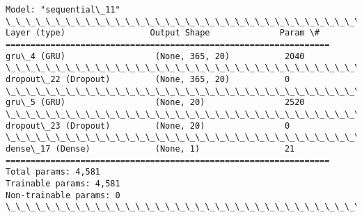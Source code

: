 \documentclass[11pt]{article}
\begin{document}
    \begin{Verbatim}[commandchars=\\\{\}]
Model: "sequential\_11"
\_\_\_\_\_\_\_\_\_\_\_\_\_\_\_\_\_\_\_\_\_\_\_\_\_\_\_\_\_\_\_\_\_\_\_\_\_\_\_\_\_\_\_\_\_\_\_\_\_\_\_\_\_\_\_\_\_\_\_\_\_\_\_\_\_
Layer (type)                 Output Shape              Param \#
=================================================================
gru\_4 (GRU)                  (None, 365, 20)           2040
\_\_\_\_\_\_\_\_\_\_\_\_\_\_\_\_\_\_\_\_\_\_\_\_\_\_\_\_\_\_\_\_\_\_\_\_\_\_\_\_\_\_\_\_\_\_\_\_\_\_\_\_\_\_\_\_\_\_\_\_\_\_\_\_\_
dropout\_22 (Dropout)         (None, 365, 20)           0
\_\_\_\_\_\_\_\_\_\_\_\_\_\_\_\_\_\_\_\_\_\_\_\_\_\_\_\_\_\_\_\_\_\_\_\_\_\_\_\_\_\_\_\_\_\_\_\_\_\_\_\_\_\_\_\_\_\_\_\_\_\_\_\_\_
gru\_5 (GRU)                  (None, 20)                2520
\_\_\_\_\_\_\_\_\_\_\_\_\_\_\_\_\_\_\_\_\_\_\_\_\_\_\_\_\_\_\_\_\_\_\_\_\_\_\_\_\_\_\_\_\_\_\_\_\_\_\_\_\_\_\_\_\_\_\_\_\_\_\_\_\_
dropout\_23 (Dropout)         (None, 20)                0
\_\_\_\_\_\_\_\_\_\_\_\_\_\_\_\_\_\_\_\_\_\_\_\_\_\_\_\_\_\_\_\_\_\_\_\_\_\_\_\_\_\_\_\_\_\_\_\_\_\_\_\_\_\_\_\_\_\_\_\_\_\_\_\_\_
dense\_17 (Dense)             (None, 1)                 21
=================================================================
Total params: 4,581
Trainable params: 4,581
Non-trainable params: 0
\_\_\_\_\_\_\_\_\_\_\_\_\_\_\_\_\_\_\_\_\_\_\_\_\_\_\_\_\_\_\_\_\_\_\_\_\_\_\_\_\_\_\_\_\_\_\_\_\_\_\_\_\_\_\_\_\_\_\_\_\_\_\_\_\_
    \end{Verbatim}
\end{document}
